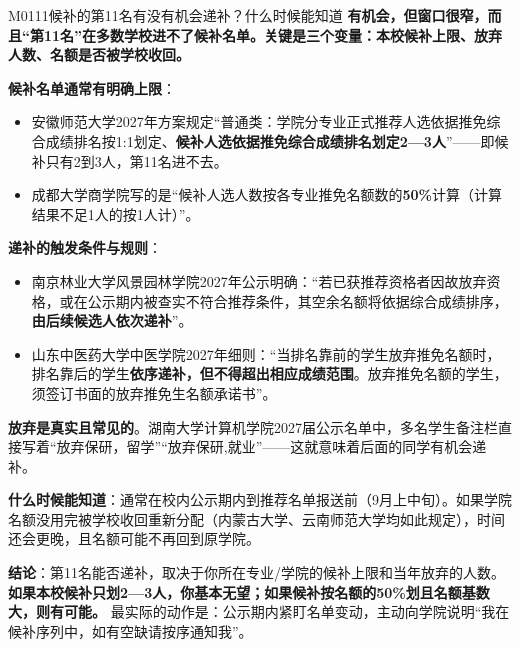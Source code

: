 \begin{qa}{M0111}{候补的第11名有没有机会递补？什么时候能知道}
\textbf{有机会，但窗口很窄，而且“第11名”在多数学校进不了候补名单。关键是三个变量：本校候补上限、放弃人数、名额是否被学校收回。}

\textbf{候补名单通常有明确上限}：
\begin{itemize}
  \item 安徽师范大学2027年方案规定“普通类：学院分专业正式推荐人选依据推免综合成绩排名按1:1划定、\textbf{候补人选依据推免综合成绩排名划定2—3人}”——即候补只有2到3人，第11名进不去。
  \item 成都大学商学院写的是“候补人选人数按各专业推免名额数的\textbf{50\%}计算（计算结果不足1人的按1人计）”。
\end{itemize}

\textbf{递补的触发条件与规则}：
\begin{itemize}
  \item 南京林业大学风景园林学院2027年公示明确：“若已获推荐资格者因故放弃资格，或在公示期内被查实不符合推荐条件，其空余名额将依据综合成绩排序，\textbf{由后续候选人依次递补}”。
  \item 山东中医药大学中医学院2027年细则：“当排名靠前的学生放弃推免名额时，排名靠后的学生\textbf{依序递补，但不得超出相应成绩范围}。放弃推免名额的学生，须签订书面的放弃推免生名额承诺书”。
\end{itemize}

\textbf{放弃是真实且常见的}。湖南大学计算机学院2027届公示名单中，多名学生备注栏直接写着“放弃保研，留学”“放弃保研,就业”——这就意味着后面的同学有机会递补。

\textbf{什么时候能知道}：通常在校内公示期内到推荐名单报送前（9月上中旬）。如果学院名额没用完被学校收回重新分配（内蒙古大学、云南师范大学均如此规定），时间还会更晚，且名额可能不再回到原学院。

\textbf{结论}：第11名能否递补，取决于你所在专业/学院的候补上限和当年放弃的人数。\textbf{如果本校候补只划2—3人，你基本无望；如果候补按名额的50\%划且名额基数大，则有可能。} 最实际的动作是：公示期内紧盯名单变动，主动向学院说明“我在候补序列中，如有空缺请按序通知我”。
\end{qa}

